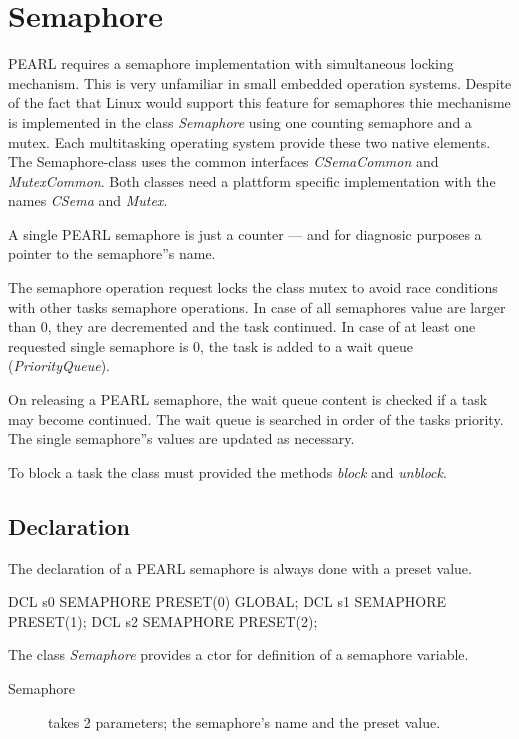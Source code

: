 \chapter{Semaphore}
PEARL requires a semaphore implementation with simultaneous locking
mechanism. This is very unfamiliar in small embedded operation systems.
Despite of the fact that Linux would support this feature for semaphores 
thie mechanisme is implemented in the class {\em Semaphore} using one counting semaphore and a mutex. 
Each multitasking operating system provide these two native elements.
The Semaphore-class uses the common interfaces {\em CSemaCommon} and 
{\em MutexCommon}. Both classes need a plattform specific implementation 
with the names {\em CSema} and {\em Mutex}.

A single PEARL semaphore is
just a counter --- and for diagnosic purposes a pointer to the semaphore''s
name.

The semaphore operation request locks the class mutex to avoid race conditions 
with other tasks semaphore operations. In case of all semaphores value are 
larger than 0, they are decremented and the task continued.
In case of at least one requested single semaphore is 0, the task is added
to a wait queue ({\em PriorityQueue}).

On releasing a PEARL semaphore, the wait queue content is checked if a 
task may become continued. The wait queue is searched in order of the tasks 
priority. The single semaphore''s  values are updated as necessary.

To block a task the class must provided the methods {\em block} and 
{\em unblock}.

\section{Declaration}
The declaration of a PEARL semaphore is always done with a preset value.

\begin{PEARLCode}
DCL s0 SEMAPHORE PRESET(0) GLOBAL;
DCL s1 SEMAPHORE PRESET(1);
DCL s2 SEMAPHORE PRESET(2);
\end{PEARLCode}

The class {\em Semaphore} provides a ctor for definition 
of a semaphore variable.
\begin{description}
\item[Semaphore] takes 2 parameters; the semaphore's name and the preset value.
\end{description}

